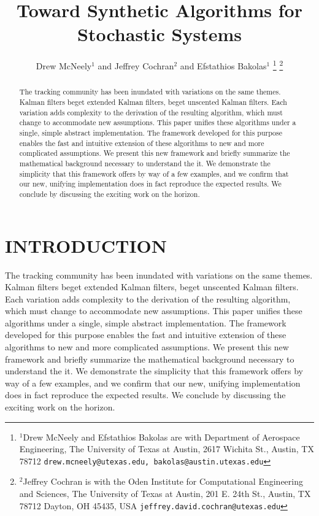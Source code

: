 \documentclass[letterpaper, 10 pt, conference]{ieeeconf}  %
\title{\LARGE \bf
Toward Synthetic Algorithms for Stochastic Systems
}
\author{Drew McNeely$^{1}$ and Jeffrey Cochran$^{2}$ and Efstathios Bakolas$^{1}$%
\thanks{$^{1}$Drew McNeely and Efstathios Bakolas are with Department of Aerospace Engineering, 
        The University of Texas at Austin, 2617 Wichita St., Austin, TX 78712
        {\tt\small drew.mcneely@utexas.edu, bakolas@austin.utexas.edu}}%
\thanks{$^{2}$Jeffrey Cochran is with the Oden Institute for Computational Engineering and Sciences, The University of Texas at Austin, 201 E. 24th St., Austin, TX 78712
        Dayton, OH 45435, USA
        {\tt\small jeffrey.david.cochran@utexas.edu}}%
}
\begin{document}
\maketitle
\thispagestyle{empty}
\pagestyle{empty}


\begin{abstract}
The tracking community has been inundated with variations on the same themes. Kalman filters beget extended Kalman filters, beget unscented Kalman filters. Each variation adds complexity to the derivation of the resulting algorithm, which must change to accommodate new assumptions. This paper unifies these algorithms under a single, simple abstract implementation. The framework developed for this purpose enables the fast and intuitive extension of these algorithms to new and more complicated assumptions. We present this new framework and briefly summarize the mathematical background necessary to understand the it. We demonstrate the simplicity that this framework offers by way of a few examples, and we confirm that our new, unifying implementation does in fact reproduce the expected results. We conclude by discussing the exciting work on the horizon. 

\end{abstract}


\section{INTRODUCTION}

The tracking community has been inundated with variations on the same themes. Kalman filters beget extended Kalman filters, beget unscented Kalman filters. Each variation adds complexity to the derivation of the resulting algorithm, which must change to accommodate new assumptions. This paper unifies these algorithms under a single, simple abstract implementation. The framework developed for this purpose enables the fast and intuitive extension of these algorithms to new and more complicated assumptions. We present this new framework and briefly summarize the mathematical background necessary to understand the it. We demonstrate the simplicity that this framework offers by way of a few examples, and we confirm that our new, unifying implementation does in fact reproduce the expected results. We conclude by discussing the exciting work on the horizon.
\end{document}
